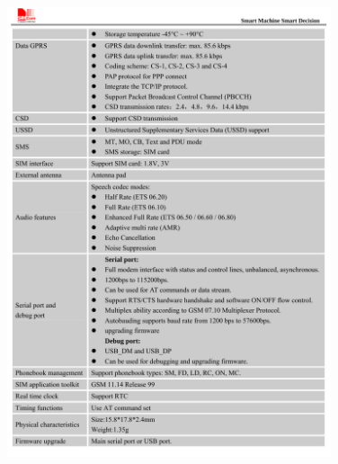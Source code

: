 \newpage
\begin{figure}[H]
\centering
\includegraphics[width=0.85\textwidth]{gprs_2.pdf}
\end{figure}
\newpage
